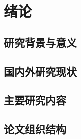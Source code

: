 \section{绪论}
\subsection{研究背景与意义}


\subsection{国内外研究现状}


\subsection{主要研究内容}


\subsection{论文组织结构}



